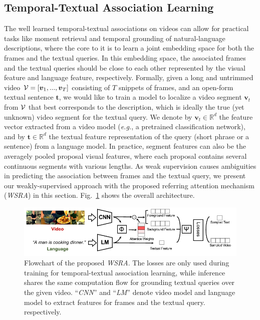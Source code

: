 \subsection{Temporal-Textual Association Learning}
The well learned temporal-textual associations on videos can allow for practical tasks like moment retrieval and temporal grounding of natural-language descriptions, where the core to it is to learn a joint embedding space for both the frames and the textual queries.
In this embedding space, the associated frames and the textual queries should be close to each other represented by the visual feature and language feature, respectively.
Formally, given a long and untrimmed video ${\cal V}=[\boldsymbol{v}_1, ..., \boldsymbol{v}_T]$ consisting of $T$ snippets of frames, and an open-form textual sentence $\boldsymbol{t}$, we would like to train a model to localize a video segment $\boldsymbol{v}_t$ from ${\cal V}$ that best corresponds to the description, which is ideally the true (yet unknown) video segment for the textual query.
We denote by $\boldsymbol{v}_t \in\mathbb{R}^{d}$ the feature vector 
extracted from a video model (\emph{e.g.}, a pretrained classification network),
and by $\boldsymbol{t}\in\mathbb{R}^{d}$ the textual feature representation of the 
query (short phrase or a sentence) from a language model.
In practice, segment features can also be the averagely pooled proposal visual features, where each proposal contains several continuous segments with various lengths. 
As weak supervision causes ambiguities in predicting the association between frames and the textual query, we present our weakly-supervised approach with the proposed referring attention mechanism (\textit{WSRA}) in this section.
Fig.~\ref{figure:over_arch} shows the overall architecture.

\begin{figure}[t]
\centering
\includegraphics[width=.95\textwidth]{images/wsra_architecture.pdf}
\caption[Flowchart of the proposed \textit{WSRA}.]{\small Flowchart of the proposed \textit{WSRA}.
The losses are only used during training for temporal-textual association learning,
while inference shares the same computation flow 
for grounding textual queries over the given video. ``\textit{CNN}'' and ``\textit{LM}'' denote
video model and language model to extract features for frames and the textual query.
respectively. 
}
\label{figure:over_arch}
\end{figure}

